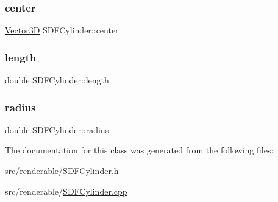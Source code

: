\mbox{\label{classSDFCylinder_a9191a358a55f4b1dd9257e0664c531ff}} 
\subsubsection{\texorpdfstring{center}{center}}
{\footnotesize\ttfamily \mbox{\hyperlink{classVector3D}{Vector3D}} S\+D\+F\+Cylinder\+::center\hspace{0.3cm}{\ttfamily [private]}}

\mbox{\label{classSDFCylinder_aae02d54259ddf572cd2b87c427dc1b08}} 
\subsubsection{\texorpdfstring{length}{length}}
{\footnotesize\ttfamily double S\+D\+F\+Cylinder\+::length\hspace{0.3cm}{\ttfamily [private]}}

\mbox{\label{classSDFCylinder_a63b1f14e28187305347485d3083f4c9b}} 
\subsubsection{\texorpdfstring{radius}{radius}}
{\footnotesize\ttfamily double S\+D\+F\+Cylinder\+::radius\hspace{0.3cm}{\ttfamily [private]}}



The documentation for this class was generated from the following files\+:\begin{DoxyCompactItemize}
\item 
src/renderable/\mbox{\hyperlink{SDFCylinder_8h}{S\+D\+F\+Cylinder.\+h}}\item 
src/renderable/\mbox{\hyperlink{SDFCylinder_8cpp}{S\+D\+F\+Cylinder.\+cpp}}\end{DoxyCompactItemize}
